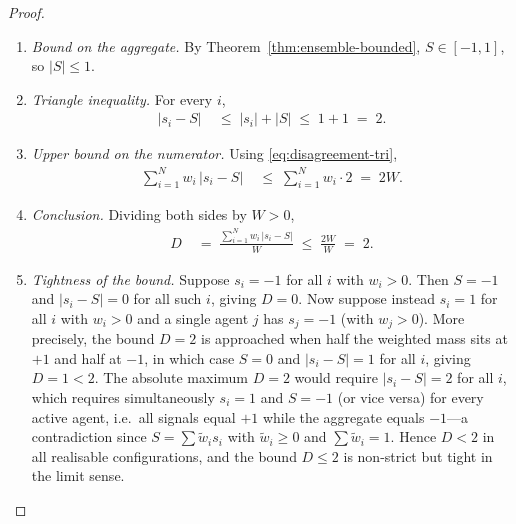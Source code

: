 \documentclass[12pt,openany]{book}
\numberwithin{equation}{chapter}
\theoremstyle{plain}
\theoremstyle{definition}
\theoremstyle{remark}
\numberwithin{equation}{chapter}
\theoremstyle{plain}
\begin{document}
\begin{proof}
\begin{enumerate}
\begin{enumerate}
    \item \emph{Bound on the aggregate.}
          By Theorem~\ref{thm:ensemble-bounded},
          $S \in [-1,1]$, so $|S| \leq 1$.

    \item \emph{Triangle inequality.}
          For every $i$,
          \begin{align}
            \bigl|s_i - S\bigr|
            &\;\leq\; |s_i| + |S|
            \;\leq\; 1 + 1
            \;=\; 2.
            \label{eq:disagreement-tri}
          \end{align}

    \item \emph{Upper bound on the numerator.}
          Using \eqref{eq:disagreement-tri},
          \begin{align}
            \sum_{i=1}^{N} w_i\,\bigl|s_i - S\bigr|
            &\;\leq\; \sum_{i=1}^{N} w_i \cdot 2
            \;=\; 2W.
          \end{align}

    \item \emph{Conclusion.}
          Dividing both sides by $W > 0$,
          \begin{align}
            D
            &\;=\;
            \frac{\displaystyle\sum_{i=1}^{N}
                  w_i\,|s_i - S|}{W}
            \;\leq\; \frac{2W}{W}
            \;=\; 2.
          \end{align}

    \item \emph{Tightness of the bound.}
          Suppose $s_i = -1$ for all $i$ with $w_i > 0$.
          Then $S = -1$ and $|s_i - S| = 0$ for all such $i$,
          giving $D = 0$.
          Now suppose instead $s_i = 1$ for all $i$ with
          $w_i > 0$ and a single agent $j$ has $s_j = -1$
          (with $w_j > 0$).  More precisely, the bound
          $D = 2$ is approached when half the weighted mass
          sits at $+1$ and half at $-1$, in which case
          $S = 0$ and $|s_i - S| = 1$ for all $i$, giving
          $D = 1 < 2$.
          The absolute maximum $D = 2$ would require
          $|s_i - S| = 2$ for all $i$, which requires
          simultaneously $s_i = 1$ and $S = -1$ (or vice
          versa) for every active agent, i.e.\ all signals
          equal $+1$ while the aggregate equals $-1$---a
          contradiction since $S = \sum \tilde{w}_i s_i$
          with $\tilde{w}_i \geq 0$ and $\sum \tilde{w}_i = 1$.
          Hence $D < 2$ in all realisable configurations,
          and the bound $D \leq 2$ is non-strict but tight
          in the limit sense.
  \end{enumerate}


\end{enumerate}
\end{proof}
\end{document}
